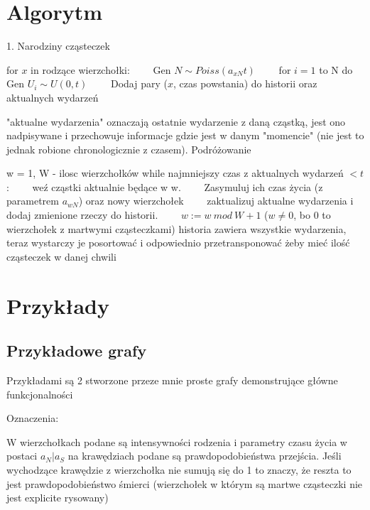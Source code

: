 \documentclass{article}
\begin{document}
\section{Algorytm}
1. Narodziny cząsteczek
\begin{algorithmic}
\State for $x$ in rodzące wierzchołki:
\State \ \ \ \ Gen $N \sim \textit{Poiss}(a_{xN}t)$
\State \ \ \ \ for $i = 1$ to N do Gen $U_i \sim U(0, t)$
\State \ \ \ \ Dodaj pary ($x$, czas powstania) do historii oraz aktualnych wydarzeń
\end{algorithmic} 
"aktualne wydarzenia" oznaczają ostatnie wydarzenie z daną cząstką, jest ono nadpisywane i przechowuje informacje gdzie jest w danym "momencie" (nie jest to jednak robione chronologicznie z czasem). Podróżowanie
\begin{algorithmic}
\State w = 1, W - ilosc wierzchołków
\State while najmniejszy czas z aktualnych wydarzeń $< t$:
\State \ \ \ \ weź cząstki aktualnie będące w w.
\State \ \ \ \ Zasymuluj ich czas życia (z parametrem $a_{wN}$) oraz nowy wierzchołek
\State \ \ \ \ zaktualizuj aktualne wydarzenia i dodaj zmienione rzeczy do historii.
\State \ \ \ \ $w := w\ mod\  W + 1$ ($w \neq 0$, bo 0 to wierzchołek z martwymi cząsteczkami)
\State historia zawiera wszystkie wydarzenia, teraz wystarczy je posortować i odpowiednio przetransponować żeby mieć ilość cząsteczek w danej chwili
\end{algorithmic} 


\section{Przykłady}

\subsection{Przykładowe grafy}

Przykładami są 2 stworzone przeze mnie proste grafy demonstrujące główne funkcjonalności

Oznaczenia:

W wierzchołkach podane są intensywności rodzenia i parametry czasu życia w postaci $a_N | a_S$
na krawędziach podane są prawdopodobieństwa przejścia. Jeśli wychodzące krawędzie z wierzchołka nie sumują się do 1 to znaczy, że reszta to jest prawdopodobieństwo śmierci (wierzchołek w którym są martwe cząsteczki nie jest explicite rysowany)
\end{document}
